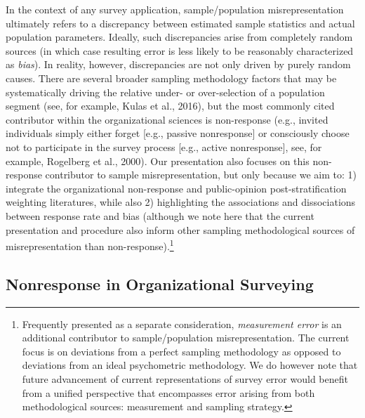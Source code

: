 \documentclass[
  man,mask]{apa7}
\begin{document}
In the context of any survey application, sample/population misrepresentation ultimately refers to a discrepancy between estimated sample statistics and actual population parameters. Ideally, such discrepancies arise from completely random sources (in which case resulting error is less likely to be reasonably characterized as \emph{bias}). In reality, however, discrepancies are not only driven by purely random causes. There are several broader sampling methodology factors that may be systematically driving the relative under- or over-selection of a population segment (see, for example, Kulas et al., 2016), but the most commonly cited contributor within the organizational sciences is non-response (e.g., invited individuals simply either forget {[}e.g., passive nonresponse{]} or consciously choose not to participate in the survey process {[}e.g., active nonresponse{]}, see, for example, Rogelberg et al., 2000). Our presentation also focuses on this non-response contributor to sample misrepresentation, but only because we aim to: 1) integrate the organizational non-response and public-opinion post-stratification weighting literatures, while also 2) highlighting the associations and dissociations between response rate and bias (although we note here that the current presentation and procedure also inform other sampling methodological sources of misrepresentation than non-response).\footnote{Frequently presented as a separate consideration, \emph{measurement error} is an additional contributor to sample/population misrepresentation. The current focus is on deviations from a perfect sampling methodology as opposed to deviations from an ideal psychometric methodology. We do however note that future advancement of current representations of survey error would benefit from a unified perspective that encompasses error arising from both methodological sources: measurement and sampling strategy.}

\hypertarget{nonresponse-in-organizational-surveying}{%
\subsection{Nonresponse in Organizational Surveying}\label{nonresponse-in-organizational-surveying}}
\end{document}

